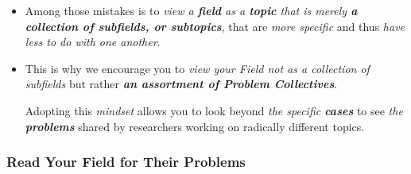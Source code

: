 \documentclass[11pt]{article}
\begin{document}
\begin{itemize}
\item Among those mistakes is to \emph{view a \textbf{field} as a \textbf{topic} that is merely \textbf{a collection of subfields, or subtopics}}, that are \emph{more specific} and thus \emph{have less to do with one another}. 

\item This is why we encourage you to \emph{view your Field not as a collection of subfields} but rather \emph{\textbf{an assortment of Problem Collectives}}. 

Adopting this \emph{mindset} allows you to look beyond \emph{the specific \textbf{cases}} to see \emph{the \textbf{problems}} shared by researchers working on radically different topics. 
\end{itemize}
\subsubsection{Read Your Field for Their Problems}
\end{document}
